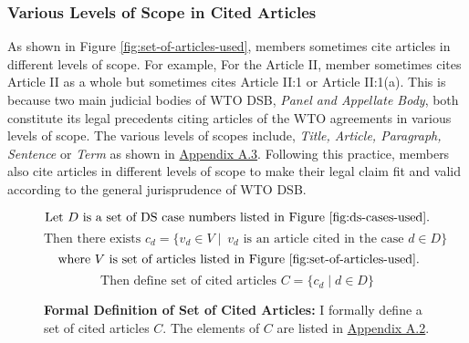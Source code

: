 \subsubsection{Various Levels of Scope in Cited Articles}

As shown in Figure \ref{fig:set-of-articles-used},
members sometimes
cite articles in different levels of scope. For example,
For the Article II, member sometimes cites
Article II as a whole but sometimes cites
Article II:1 or Article II:1(a).
This is because two main judicial bodies of WTO DSB, \textit{Panel and Appellate Body},
both constitute its legal precedents citing articles of the WTO agreements in
various levels of scope.
The various levels of scopes include, \textit{Title, Article, Paragraph, Sentence} or \textit{Term} as shown in  \hyperref[xltabular:level-of-scopes]{Appendix A.3}.
Following this practice, members also cite articles in different levels of scope to
make their legal claim fit and valid according to the general jurisprudence of WTO DSB.\\ %

\begin{figure}[t]
   \[\text{Let } D \text{ is a set of DS case numbers listed in Figure \ref{fig:ds-cases-used}.} \] %
   \[\text{Then there exists } c_d = \{v_d \in V \mid\ v_d \text{ is an article cited in the case } d \in D\} \]
   \[\text{ where } V \text{ is set of articles listed in Figure \ref{fig:set-of-articles-used}}.\]
   \[\text{Then define set of cited articles } C = \{c_d \mid d \in D\}\]
   \caption{\textbf{Formal Definition of Set of Cited Articles: }I formally define a set of cited articles $C$. The elements of $C$ are listed in \hyperref[sub:cited-articles-table]{Appendix A.2}.}
   \label{fig:def:set-of-cited-articles}
\end{figure}



